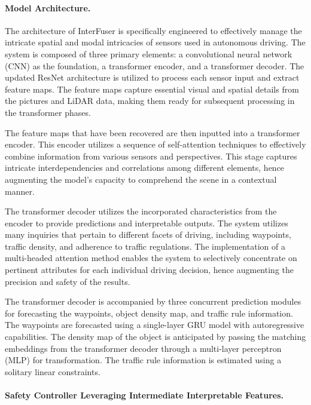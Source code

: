 \paragraph{Model Architecture.}

The architecture of InterFuser is specifically engineered to effectively manage the intricate spatial and modal intricacies of sensors used in autonomous driving. The system is composed of three primary elements: a convolutional neural network (CNN) as the foundation, a transformer encoder, and a transformer decoder. The updated ResNet architecture is utilized to process each sensor input and extract feature maps. The feature maps capture essential visual and spatial details from the pictures and LiDAR data, making them ready for subsequent processing in the transformer phases.

The feature maps that have been recovered are then inputted into a transformer encoder. This encoder utilizes a sequence of self-attention techniques to effectively combine information from various sensors and perspectives. This stage captures intricate interdependencies and correlations among different elements, hence augmenting the model's capacity to comprehend the scene in a contextual manner.

The transformer decoder utilizes the incorporated characteristics from the encoder to provide predictions and interpretable outputs. The system utilizes many inquiries that pertain to different facets of driving, including waypoints, traffic density, and adherence to traffic regulations. The implementation of a multi-headed attention method enables the system to selectively concentrate on pertinent attributes for each individual driving decision, hence augmenting the precision and safety of the results.

The transformer decoder is accompanied by three concurrent prediction modules for forecasting the waypoints, object density map, and traffic rule information. The waypoints are forecasted using a single-layer GRU model with autoregressive capabilities. The density map of the object is anticipated by passing the matching embeddings from the transformer decoder through a multi-layer perceptron (MLP) for transformation. The traffic rule information is estimated using a solitary linear constraints.


\paragraph{Safety Controller Leveraging Intermediate Interpretable Features.}

